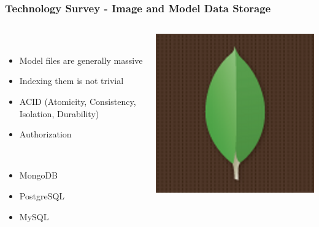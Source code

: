 \begin{frame}
  \frametitle{Technology Survey - Image and Model Data Storage}
  \begin{columns}
    \begin{column}{0.8\textwidth}
      \begin{description}[]
        \item[Database - To Embrace or Avoid?] \hfill \\
        \begin{itemize}
          \item Model files are generally massive
          \item Indexing them is not trivial
          \item ACID (Atomicity, Consistency, Isolation, Durability)
          \item Authorization
        \end{itemize}
        \item[Candidates] \hfill \\
        \begin{itemize}
          \item MongoDB
          \item PostgreSQL
          \item MySQL
        \end{itemize}
      \end{description}  
    \end{column} 	
    \begin{column}{0.2\textwidth}
      \includegraphics[width=.9\textwidth]{images/mongo}\\

\end{column}
\end{columns}
\end{frame}
